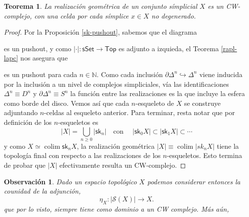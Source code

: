 \documentclass[11pt]{report}
\theoremstyle{colored}
\newtheorem{theorem}{Teorema}[section]
\newtheorem{remark}{Observación}[section]
\newcommand{\N}{\mathbb{N}}
\newcommand{\cat}[1]{\mathsf{#1}}
\newcommand{\sk}{\mathsf{sk}}
\renewcommand{\ss}[1]{\Delta^{#1}}
\begin{document}
\begin{theorem} La realización geométrica de un conjunto símplicial $X$ es un CW-complejo, con una celda por cada símplice $x \in X$ no degenerado.
\end{theorem}
\begin{proof} Por la Proposición \ref{sk-pushout}, sabemos que el diagrama
\begin{center}
\end{center}
es un pushout, y como $| \cdot | : \cat{sSet} \to \cat{Top}$ es adjunto a izquieda, el Teorema \ref{rapl-lapc} nos asegura que
\begin{center}
\end{center}
es un pushout para cada $n \in \N$. Como cada inclusión $\partial \ss{n} \hookrightarrow \ss{n}$ viene inducida por la inclusión a un nivel de complejos simpliciales, vía las identificaciones $\ss{n} \equiv D^n$ y $\partial \ss{n} \equiv S^n$ la función entre las realizaciones es la que incluye la esfera como borde del disco. Vemos así que cada $n$-esqueleto de $X$ se construye adjuntando $n$-celdas al esqueleto anterior. Para terminar, resta notar que por definición de los $n$-esqueletos es
\[
|X| = \bigcup_{n \geq 0} |\sk_n| \quad \text{con } \quad |\sk_0 X| \subset |\sk_1 X| \subset  \cdots
\] 
y como $X \simeq \operatorname{colim} \sk_nX$, la realización geométrica $|X|\equiv \operatorname{colim} |sk_n X|$ tiene la topología final con respecto a las realizaciones de los $n$-esqueletos. Esto termina de probar que $|X|$ efectivamente resulta un CW-complejo.
\end{proof}

\begin{remark} Dado un espacio topológico $X$ podemos considerar entonces la counidad de la adjunción, 
\[
\eta_X : |\mathcal{S}(X)|\to X.
\]
que por lo visto, siempre tiene como dominio a un CW complejo. Más aún, 
\end{remark}
\end{document}
